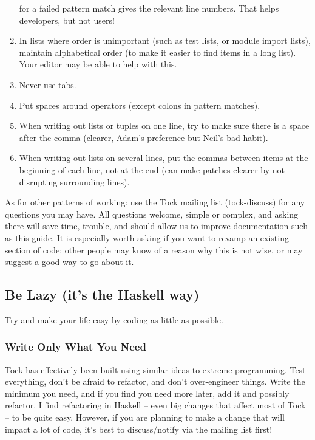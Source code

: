 \documentclass[a4wide]{article}
\begin{document}
\begin{enumerate}
for a failed pattern match gives the relevant line numbers.  That helps developers, but not users!
%
\item In lists where order is unimportant (such as test lists, or module import lists), maintain
alphabetical order (to make it easier to find items in a long list).  Your editor may be able to help
with this.
\item Never use tabs.
\item Put spaces around operators (except colons in pattern matches).
\item When writing out lists or tuples on one line, try to make sure there is a space after the comma (clearer,
Adam's preference but Neil's bad habit).
\item When writing out lists on several lines, put the commas between items at the beginning of each line,
not at the end (can make patches clearer by not disrupting surrounding lines).
\end{enumerate}	

As for other patterns of working: use the Tock mailing list (tock-discuss) for any questions you may have.
All questions welcome, simple or complex, and asking there will save time, trouble, and should allow us
to improve documentation such as this guide.  It is especially worth asking if you want to revamp
an existing section of code; other people may know of a reason why this is not wise, or may suggest a
good way to go about it.

\subsection{Be Lazy (it's the Haskell way)}

Try and make your life easy by coding as little as possible.

\subsubsection{Write Only What You Need}

Tock has effectively been built using similar ideas to extreme programming.  Test everything,
don't be afraid to refactor, and don't over-engineer things.  Write the minimum you need, and if you
find you need more later, add it and possibly refactor.  I find refactoring in Haskell -- even big
changes that affect most of Tock -- to be quite easy.  However, if you are planning to make a change
that will impact a lot of code, it's best to discuss/notify via the mailing list first!
\end{document}
